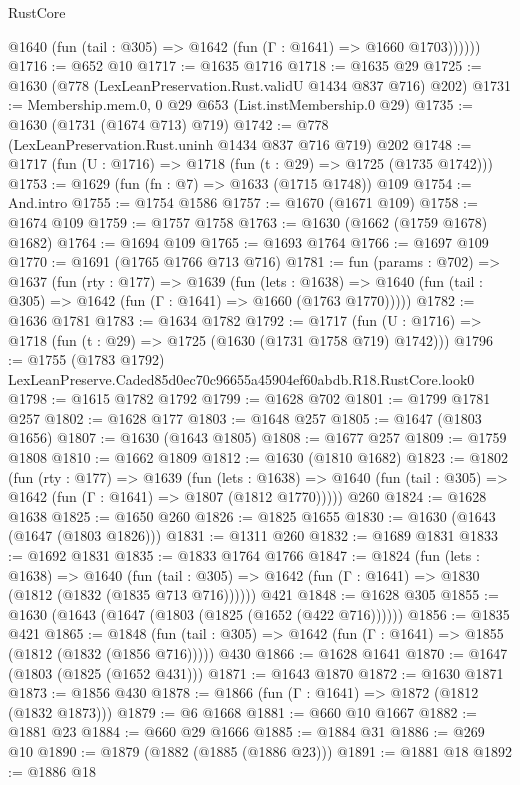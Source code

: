 \begin{lexlean}{RustCore}
\begin{coremodule}
          @1640 (fun (tail : @305) => @1642 (fun (Γ : @1641) => @1660 @1703))))))
@1716 := @652 @10
@1717 := @1635 @1716
@1718 := @1635 @29
@1725 := @1630 (@778 (LexLeanPreservation.Rust.validU @1434 @837 @716) @202)
@1731 := Membership.mem.{0, 0} @29 @653 (List.instMembership.{0} @29)
@1735 := @1630 (@1731 (@1674 @713) @719)
@1742 := @778 (LexLeanPreservation.Rust.uninh @1434 @837 @716 @719) @202
@1748 := @1717 (fun (U : @1716) => @1718 (fun (t : @29) => @1725 (@1735 @1742)))
@1753 := @1629 (fun (fn : @7) => @1633 (@1715 @1748)) @109
@1754 := And.intro
@1755 := @1754 @1586
@1757 := @1670 (@1671 @109)
@1758 := @1674 @109
@1759 := @1757 @1758
@1763 := @1630 (@1662 (@1759 @1678) @1682)
@1764 := @1694 @109
@1765 := @1693 @1764
@1766 := @1697 @109
@1770 := @1691 (@1765 @1766 @713 @716)
@1781 := fun (params : @702) =>
  @1637
    (fun (rty : @177) =>
    @1639
      (fun (lets : @1638) =>
      @1640 (fun (tail : @305) => @1642 (fun (Γ : @1641) => @1660 (@1763 @1770)))))
@1782 := @1636 @1781
@1783 := @1634 @1782
@1792 := @1717 (fun (U : @1716) => @1718 (fun (t : @29) => @1725 (@1630 (@1731 @1758 @719) @1742)))
@1796 := @1755 (@1783 @1792) LexLeanPreserve.Caded85d0ec70c96655a45904ef60abdb.R18.RustCore.look0
@1798 := @1615 @1782 @1792
@1799 := @1628 @702
@1801 := @1799 @1781 @257
@1802 := @1628 @177
@1803 := @1648 @257
@1805 := @1647 (@1803 @1656)
@1807 := @1630 (@1643 @1805)
@1808 := @1677 @257
@1809 := @1759 @1808
@1810 := @1662 @1809
@1812 := @1630 (@1810 @1682)
@1823 := @1802
    (fun (rty : @177) =>
    @1639
      (fun (lets : @1638) =>
      @1640 (fun (tail : @305) => @1642 (fun (Γ : @1641) => @1807 (@1812 @1770)))))
    @260
@1824 := @1628 @1638
@1825 := @1650 @260
@1826 := @1825 @1655
@1830 := @1630 (@1643 (@1647 (@1803 @1826)))
@1831 := @1311 @260
@1832 := @1689 @1831
@1833 := @1692 @1831
@1835 := @1833 @1764 @1766
@1847 := @1824
    (fun (lets : @1638) =>
    @1640 (fun (tail : @305) => @1642 (fun (Γ : @1641) => @1830 (@1812 (@1832 (@1835 @713 @716))))))
    @421
@1848 := @1628 @305
@1855 := @1630 (@1643 (@1647 (@1803 (@1825 (@1652 (@422 @716))))))
@1856 := @1835 @421
@1865 := @1848
    (fun (tail : @305) => @1642 (fun (Γ : @1641) => @1855 (@1812 (@1832 (@1856 @716)))))
    @430
@1866 := @1628 @1641
@1870 := @1647 (@1803 (@1825 (@1652 @431)))
@1871 := @1643 @1870
@1872 := @1630 @1871
@1873 := @1856 @430
@1878 := @1866 (fun (Γ : @1641) => @1872 (@1812 (@1832 @1873)))
@1879 := @6 @1668
@1881 := @660 @10 @1667
@1882 := @1881 @23
@1884 := @660 @29 @1666
@1885 := @1884 @31
@1886 := @269 @10
@1890 := @1879 (@1882 (@1885 (@1886 @23)))
@1891 := @1881 @18
@1892 := @1886 @18

\end{coremodule}
\end{lexlean}
